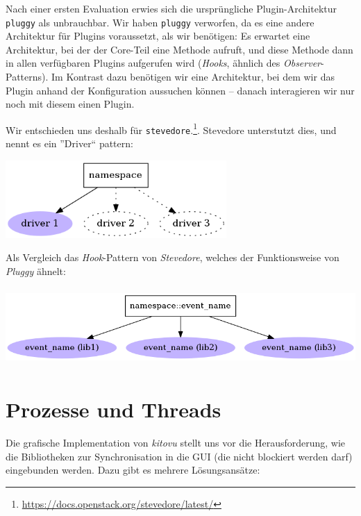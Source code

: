 \documentclass[a4paper]{article}
\let\oldsection\section
\renewcommand\section{\clearpage\oldsection}
\begin{document}
Nach einer ersten Evaluation erwies sich die ursprüngliche Plugin-Architektur \verb|pluggy| als unbrauchbar. Wir haben \verb|pluggy| verworfen, da es eine andere Architektur für Plugins
voraussetzt, als wir benötigen: Es erwartet eine Architektur, bei der der
Core-Teil eine Methode aufruft, und diese Methode dann in allen verfügbaren
Plugins aufgerufen wird (\emph{Hooks}, ähnlich des \emph{Observer}-Patterns). Im Kontrast dazu
benötigen wir eine Architektur, bei dem wir das Plugin anhand der Konfiguration
aussuchen können -- danach interagieren wir nur noch mit diesem einen Plugin.

Wir entschieden uns deshalb für \verb|stevedore|.\footnote{\url{https://docs.openstack.org/stevedore/latest/}}. Stevedore unterstutzt dies, und nennt es ein ''Driver`` pattern: \\

\begin{center}
	\includegraphics[height=8em]{img/stevedore_driver.png}
\end{center}

Als Vergleich das \emph{Hook}-Pattern von \emph{Stevedore}, welches der
Funktionsweise von \emph{Pluggy} ähnelt:

\begin{center}
	\includegraphics[height=8em]{img/stevedore_hooks.png}
\end{center}

\section{Prozesse und Threads}


Die grafische Implementation von \emph{kitovu} stellt uns vor die Herausforderung, wie die Bibliotheken zur Synchronisation in die GUI (die nicht blockiert werden darf) eingebunden werden. Dazu gibt es mehrere Lösungsansätze:
\end{document}
